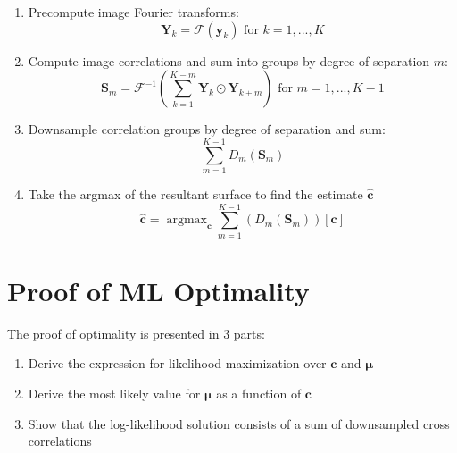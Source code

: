 \documentclass{article}
\DeclareMathOperator*{\argmax}{\arg\max}
\begin{document}
\begin{enumerate}
  \item Precompute image Fourier transforms:
    $$\bm{Y}_k=\mathcal{F}(\bm{y}_k) \text{ for } k=1,...,K$$
  \item Compute image correlations and sum into groups by degree of separation $m$:
    $$\bm{S}_m = \mathcal{F}^{-1} \left( \sum_{k=1}^{K-m} \bm{Y}_k \odot \bm{Y}_{k+m} \right) \text{ for } m=1, ..., K-1$$
  \item Downsample correlation groups by degree of separation and sum:
    $$\sum_{m=1}^{K-1} D_m \left( \bm{S}_m \right)$$
  \item Take the argmax of the resultant surface to find the estimate $\hat{\bm{c}}$
    $$\hat{\bm{c}} = \argmax_{\bm{c}} \sum_{m=1}^{K-1} \left(D_m \left( \bm{S}_m \right)\right)[\bm{c}]$$
\end{enumerate}


\section{Proof of ML Optimality}
\label{sec:optimality}

The proof of optimality is presented in 3 parts:

\begin{enumerate}
\item Derive the expression for likelihood maximization over $\bm{c}$ and $\bm{\mu}$
\item Derive the most likely value for $\bm{\mu}$ as a function of $\bm{c}$
\item Show that the log-likelihood solution consists of a sum of downsampled cross correlations
\end{enumerate}
\end{document}

